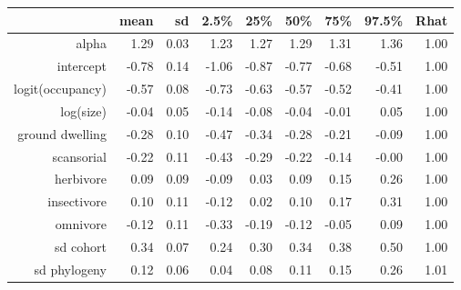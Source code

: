 \begin{table}[ht]
\centering
\begin{tabular}{rrrrrrrrr}
  \hline
 & mean & sd & 2.5\% & 25\% & 50\% & 75\% & 97.5\% & Rhat \\ 
  \hline
alpha & 1.29 & 0.03 & 1.23 & 1.27 & 1.29 & 1.31 & 1.36 & 1.00 \\ 
  intercept & -0.78 & 0.14 & -1.06 & -0.87 & -0.77 & -0.68 & -0.51 & 1.00 \\ 
  logit(occupancy) & -0.57 & 0.08 & -0.73 & -0.63 & -0.57 & -0.52 & -0.41 & 1.00 \\ 
  log(size) & -0.04 & 0.05 & -0.14 & -0.08 & -0.04 & -0.01 & 0.05 & 1.00 \\ 
  ground dwelling & -0.28 & 0.10 & -0.47 & -0.34 & -0.28 & -0.21 & -0.09 & 1.00 \\ 
  scansorial & -0.22 & 0.11 & -0.43 & -0.29 & -0.22 & -0.14 & -0.00 & 1.00 \\ 
  herbivore & 0.09 & 0.09 & -0.09 & 0.03 & 0.09 & 0.15 & 0.26 & 1.00 \\ 
  insectivore & 0.10 & 0.11 & -0.12 & 0.02 & 0.10 & 0.17 & 0.31 & 1.00 \\ 
  omnivore & -0.12 & 0.11 & -0.33 & -0.19 & -0.12 & -0.05 & 0.09 & 1.00 \\ 
  sd cohort & 0.34 & 0.07 & 0.24 & 0.30 & 0.34 & 0.38 & 0.50 & 1.00 \\ 
  sd phylogeny & 0.12 & 0.06 & 0.04 & 0.08 & 0.11 & 0.15 & 0.26 & 1.01 \\ 
   \hline
\end{tabular}
\label{post_sum}
\end{table}
